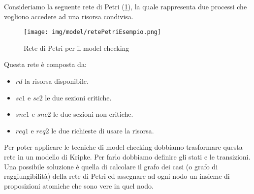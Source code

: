\begin{esempio}
    Consideriamo la seguente rete di Petri (\ref{fig:retePetriEsempio}), la
    quale rappresenta due processi che vogliono accedere ad una risorsa condivisa.
    \begin{figure}
        \centering
        \texttt{[image: img/model/retePetriEsempio.png]}
        \caption{Rete di Petri per il model checking}
        \label{fig:retePetriEsempio}
    \end{figure}
    Questa rete è composta da:
    \begin{itemize}
        \item $rd$ la risorsa disponibile.
        \item $sc1$ e $sc2$ le due sezioni critiche.
        \item $snc1$ e $snc2$ le due sezioni non critiche.
        \item $req1$ e $req2$ le due richieste di usare la risorsa.
    \end{itemize}
    Per poter applicare le tecniche di model checking dobbiamo trasformare questa
    rete in un modello di Kripke. Per farlo dobbiamo definire gli stati e le
    transizioni. Una possibile soluzione è quella di calcolare il grafo dei casi
    (o grafo di raggiungibilità) della rete di Petri ed assegnare ad ogni nodo
    un insieme di proposizioni atomiche che sono vere in quel nodo.


\end{esempio}
